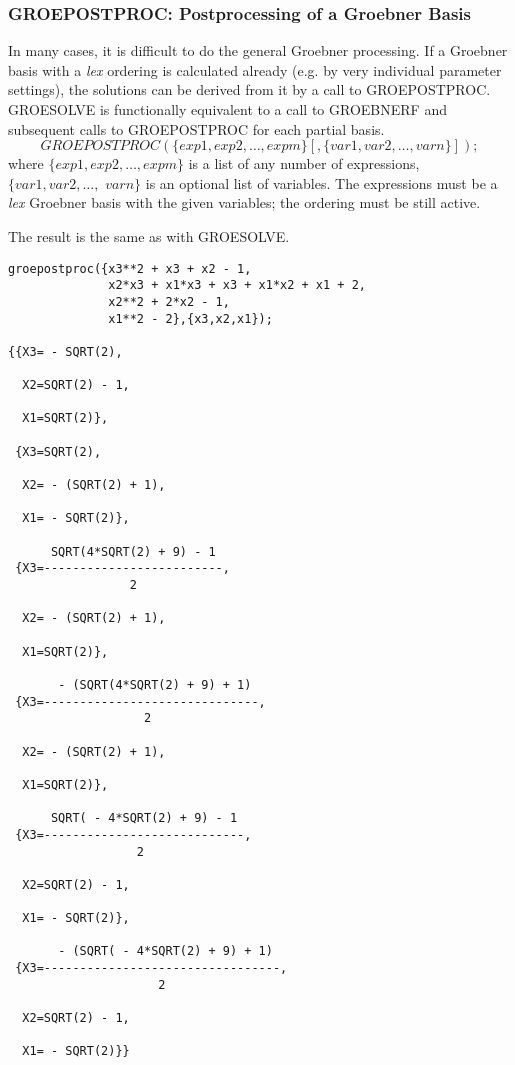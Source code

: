 \subsubsection{GROEPOSTPROC: Postprocessing of a Groebner Basis}
In many cases, it is difficult to do the general Groebner processing.
If a Groebner basis with a {\it lex} ordering is calculated already (e.g.
by very individual parameter settings), the solutions can be derived
from it by a call to GROEPOSTPROC. GROESOLVE is functionally
equivalent to a call to GROEBNERF and subsequent calls to
GROEPOSTPROC for each partial basis.
\[
 GROEPOSTPROC(\{exp1, exp2, \ldots , expm\}[,\{var1, var2, \ldots ,
varn\}]);
\]
where $\{exp1, exp2, \ldots , expm\}$ is a list of any number of
expressions, \linebreak[4] $\{var1, var2, \ldots ,$ $ varn\}$ is an
optional list of variables. The expressions must be a {\it lex} Groebner
basis with the given variables; the ordering must be still active.

The result is the same as with GROESOLVE.

\begin{verbatim}
groepostproc({x3**2 + x3 + x2 - 1,
              x2*x3 + x1*x3 + x3 + x1*x2 + x1 + 2,
              x2**2 + 2*x2 - 1,
              x1**2 - 2},{x3,x2,x1});

{{X3= - SQRT(2),

  X2=SQRT(2) - 1,

  X1=SQRT(2)},

 {X3=SQRT(2),

  X2= - (SQRT(2) + 1),

  X1= - SQRT(2)},

      SQRT(4*SQRT(2) + 9) - 1
 {X3=-------------------------,
                 2

  X2= - (SQRT(2) + 1),

  X1=SQRT(2)},

       - (SQRT(4*SQRT(2) + 9) + 1)
 {X3=------------------------------,
                   2

  X2= - (SQRT(2) + 1),

  X1=SQRT(2)},

      SQRT( - 4*SQRT(2) + 9) - 1
 {X3=----------------------------,
                  2

  X2=SQRT(2) - 1,

  X1= - SQRT(2)},

       - (SQRT( - 4*SQRT(2) + 9) + 1)
 {X3=---------------------------------,
                     2

  X2=SQRT(2) - 1,

  X1= - SQRT(2)}}
\end{verbatim}


